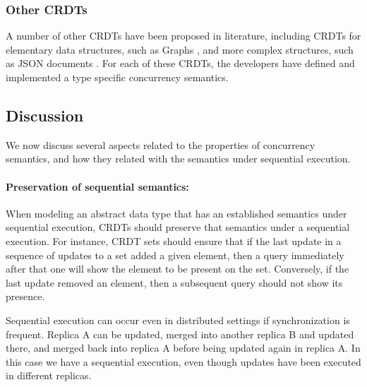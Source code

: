 \documentclass[12pt]{article}
\begin{document}
\subsubsection{Other CRDTs} 
A number of other CRDTs have been proposed in literature, including 
CRDTs for elementary data structures, such as Graphs \cite{Shapiro11Conflict}, and more
complex structures, such as JSON documents \cite{Kleppmann17JSON}.
For each of these CRDTs, the developers have defined and implemented a type specific 
concurrency semantics.

\subsection{Discussion}

We now discuss several aspects related to the properties of concurrency semantics,
and how they related with the semantics under sequential execution.


\paragraph{Preservation of sequential semantics:}
When modeling an abstract data type that has an established semantics 
under sequential execution, CRDTs should preserve that semantics under a
sequential execution. 
For instance, CRDT sets should ensure that if the last update in a sequence 
of updates to a set added a given element, then a query immediately 
after that one will show the element to be present on the set. 
Conversely, if the last update removed an element, then a subsequent 
query should not show its presence. 

Sequential execution can occur even in distributed settings if 
synchronization is frequent. 
Replica A can be updated, merged into another replica B and updated there, 
and merged back into replica A before being updated again in replica A. 
In this case we have a sequential execution, even though updates 
have been executed in different replicas.
\end{document}
